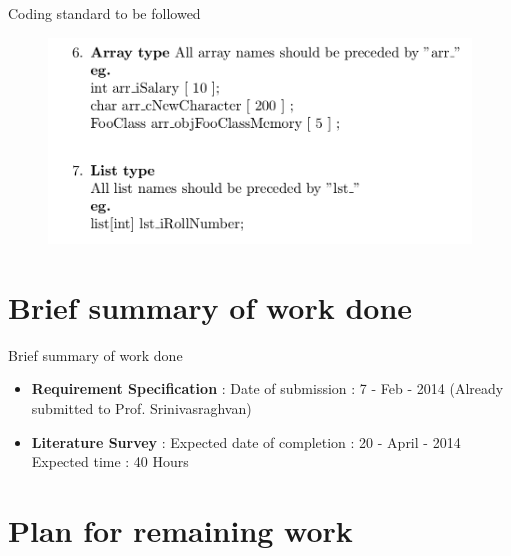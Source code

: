 \documentclass[color=usenames,dvipsnames]{beamer}
\begin{document}
\begin{frame}{Coding standard to be followed}

\begin{figure}[h!]  
  \centering
  \includegraphics[width=.9\textwidth]{4.png}  
  \end{figure} 
\end{frame}


\section{Brief summary of work done}

\begin{frame}{Brief summary of work done}

\begin{itemize}
  \setlength{\itemsep}{25pt}

  \item \textbf{Requirement Specification} : Date of submission : 7 - Feb - 2014
(Already submitted to Prof. Srinivasraghvan)

\item \textbf{Literature Survey} : Expected date of completion : 20 - April - 2014
Expected time : 40 Hours
\end{itemize}

\end{frame}


\section{Plan for remaining work}
\end{document}
